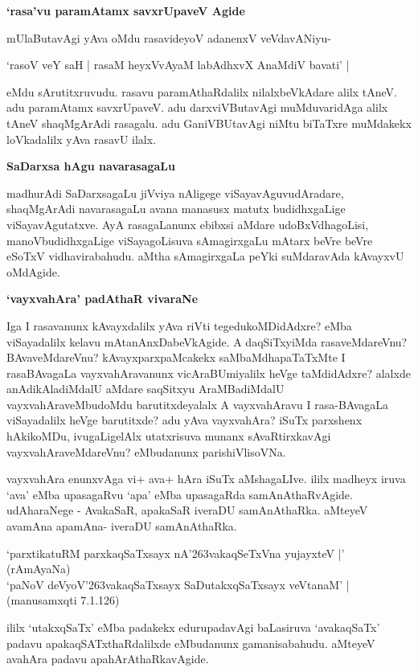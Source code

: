 {\bf `rasa'vu paramAtamx savxrUpaveV Agide} 

mUlaButavAgi yAva oMdu rasavideyoV adanenxV veVdavANiyu-

\begin{shloka}
`rasoV veY saH | rasaM heyxVvAyaM labAdhxvX AnaMdiV bavati' |
\end{shloka}

eMdu sArutitxruvudu. rasavu paramAthaRdalilx nilalxbeVkAdare alilx tAneV. adu paramAtamx savxrUpaveV. adu darxviVButavAgi muMduvaridAga alilx tAneV shaqMgArAdi rasagalu. adu GaniVBUtavAgi niMtu biTaTxre muMdakekx loVkadalilx yAva rasavU ilalx.

{\bf SaDarxsa hAgu navarasagaLu}

madhurAdi SaDarxsagaLu jiVviya nAligege viSayavAguvudAradare, shaqMgArAdi navarasagaLu avana manasusx matutx budidhxgaLige viSayavAgutatxve. AyA rasagaLanunx ebibxsi aMdare udoBxVdhagoLisi, manoVbudidhxgaLige viSayagoLisuva sAmagirxgaLu mAtarx beVre beVre eSoTxV vidhavirabahudu. aMtha sAmagirxgaLa peYki suMdaravAda kAvayxvU oMdAgide. 

{\bf `vayxvahAra' padAthaR vivaraNe}

Iga I rasavanunx kAvayxdalilx yAva riVti tegedukoMDidAdxre? eMba viSayadalilx kelavu mAtanAnxDabeVkAgide. A daqSiTxyiMda rasaveMdareVnu? BAvaveMdareVnu? kAvayxparxpaMcakekx saMbaMdhapaTaTxMte I rasaBAvagaLa vayxvahAravanunx vicAraBUmiyalilx heVge taMdidAdxre? alalxde anAdikAladiMdalU aMdare saqSitxyu AraMBadiMdalU vayxvahAraveMbudoMdu barutitxdeyalalx A vayxvahAravu I rasa-BAvagaLa viSayadalilx heVge barutitxde? adu yAva vayxvahAra? iSuTx parxshenx hAkikoMDu, ivugaLigelAlx utatxrisuva munanx sAvaRtirxkavAgi vayxvahAraveMdareVnu? eMbudanunx parishiVlisoVNa.

vayxvahAra enunxvAga vi+ ava+ hAra iSuTx aMshagaLIve. ililx madheyx iruva `ava' eMba upasagaRvu `apa' eMba upasagaRda samAnAthaRvAgide. udAharaNege - AvakaSaR, apakaSaR iveraDU samAnAthaRka. aMteyeV avamAna apamAna- iveraDU samAnAthaRka.

\begin{shloka}
`parxtikatuRM parxkaqSaTxsayx nA\char'263vakaqSeTxVna yujayxteV |' (rAmAyaNa)\\
`paNoV deVyoV\char'263vakaqSaTxsayx SaDutakxqSaTxsayx veVtanaM' | (manusamxqti 7.1.126)
\end{shloka}

ililx `utakxqSaTx' eMba padakekx edurupadavAgi baLasiruva `avakaqSaTx' padavu apakaqSATxthaRdalilxde eMbudanunx gamanisabahudu. aMteyeV avahAra padavu apahArAthaRkavAgide.

